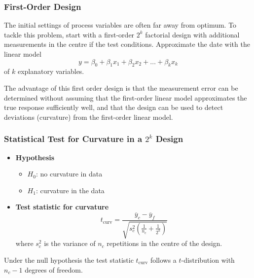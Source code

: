 \documentclass[11pt]{article}
\theoremstyle{definition}
\newcommand*\samplemean[1]{\overline{#1}}
\begin{document}
\subsubsection{First-Order Design}
The initial settings of process variables are often far away from optimum. To tackle this problem, start with a first-order $2^k$ factorial design with additional measurements in the centre if the test conditions. Approximate the date with the linear model
\begin{equation*}
	y = \beta_0 + \beta_1 x_1 + \beta_2 x_2 + \dots + \beta_k x_k
\end{equation*}
of $k$ explanatory variables.

The advantage of this first order design is that the measurement error can be determined without assuming that the first-order linear model approximates the true response sufficiently well, and that the design can be used to detect deviations (curvature) from the first-order linear model.

\subsubsection{Statistical Test for Curvature in a $2^k$ Design}
\begin{itemize}[leftmargin=*,label=]
	\item \textbf{Hypothesis}
	\begin{itemize}
		\item $H_0$: no curvature in data
		\item $H_1$: curvature in the data
	\end{itemize}
	\item \textbf{Test statistic for curvature}
	\begin{equation*}
		t_{\text{curv}} = \frac{\samplemean{y}_c - \samplemean{y}_f}{\sqrt{s_c^2\left(\frac{1}{n_c} + \frac{1}{2^k}\right)}}
	\end{equation*}
	where $s_c^2$ is the variance of $n_c$ repetitions in the centre of the design.
\end{itemize}

Under the null hypothesis the test statistic $t_{\text{curv}}$ follows a $t$-distribution with $n_c-1$ degrees of freedom.
\end{document}
